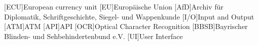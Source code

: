 \begin{acronym}[ECU]
[ECU]{European currency unit}
[EU]{Europäische Union}
[AfD]{Archiv für Diplomatik, Schriftgeschichte, Siegel- und Wappenkunde}
[I/O]{Input and Output}
[ATM]{ATM}
[API]{API}
[OCR]{Optical Character Recognition}
[BBSB]{Bayrischer Blinden- und Sehbehindertenbund e.V.}
[UI]{User Interface}
\end{acronym}

